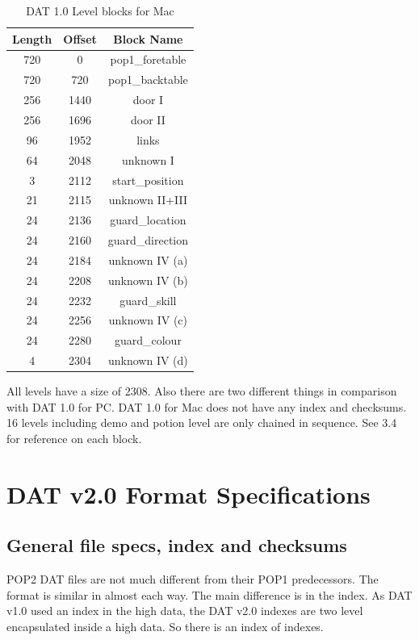 \documentclass{article}
\begin{document}
\begin{table}
\begin{tabular}{ccc}
\hline
 Length& Offset & Block Name \\
\hline
 720   & 0      & pop1\_foretable \\
 720   & 720    & pop1\_backtable \\
 256   & 1440   & door I \\
 256   & 1696   & door II \\
 96    & 1952   & links \\
 64    & 2048   & unknown I \\
 3     & 2112   & start\_position \\
 21    & 2115   & unknown II+III \\
 24    & 2136   & guard\_location \\
 24    & 2160   & guard\_direction \\
 24    & 2184   & unknown IV (a) \\
 24    & 2208   & unknown IV (b) \\
 24    & 2232   & guard\_skill \\
 24    & 2256   & unknown IV (c) \\
 24    & 2280   & guard\_colour \\
 4     & 2304   & unknown IV (d) \\
\hline
\end{tabular}
\caption{DAT 1.0 Level blocks for Mac}
\label{palettes table}
\end{table}

  All levels have a size of 2308. Also there are two different things 
  in comparison with DAT 1.0 for PC. DAT 1.0 for Mac does not have 
  any index and checksums. 16 levels including demo and potion level
  are only chained in sequence. See 3.4 for reference on each block.


\section{DAT v2.0 Format Specifications}

\subsection{General file specs, index and checksums}
 POP2 DAT files are not much different from their POP1 predecessors.
 The format is similar in almost each way. The main difference is in the
 index. As DAT v1.0 used an index in the high data, the DAT v2.0 indexes
 are two level encapsulated inside a high data. So there is an index of
 indexes.
\end{document}
